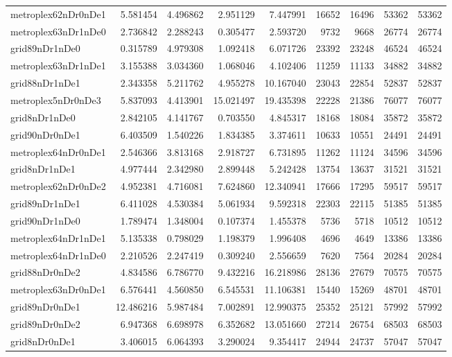 \begin{longtable}{|l|r|r|r|r|r|r|r|r|}
metroplex62nDr0nDe1 & 5.581454 & 4.496862 & 2.951129 & 7.447991 & 16652 & 16496 & 53362 & 53362 \\
metroplex63nDr1nDe0 & 2.736842 & 2.288243 & 0.305477 & 2.593720 & 9732 & 9668 & 26774 & 26774 \\
grid89nDr1nDe0 & 0.315789 & 4.979308 & 1.092418 & 6.071726 & 23392 & 23248 & 46524 & 46524 \\
metroplex63nDr1nDe1 & 3.155388 & 3.034360 & 1.068046 & 4.102406 & 11259 & 11133 & 34882 & 34882 \\
grid88nDr1nDe1 & 2.343358 & 5.211762 & 4.955278 & 10.167040 & 23043 & 22854 & 52837 & 52837 \\
metroplex5nDr0nDe3 & 5.837093 & 4.413901 & 15.021497 & 19.435398 & 22228 & 21386 & 76077 & 76077 \\
grid8nDr1nDe0 & 2.842105 & 4.141767 & 0.703550 & 4.845317 & 18168 & 18084 & 35872 & 35872 \\
grid90nDr0nDe1 & 6.403509 & 1.540226 & 1.834385 & 3.374611 & 10633 & 10551 & 24491 & 24491 \\
metroplex64nDr0nDe1 & 2.546366 & 3.813168 & 2.918727 & 6.731895 & 11262 & 11124 & 34596 & 34596 \\
grid8nDr1nDe1 & 4.977444 & 2.342980 & 2.899448 & 5.242428 & 13754 & 13637 & 31521 & 31521 \\
metroplex62nDr0nDe2 & 4.952381 & 4.716081 & 7.624860 & 12.340941 & 17666 & 17295 & 59517 & 59517 \\
grid89nDr1nDe1 & 6.411028 & 4.530384 & 5.061934 & 9.592318 & 22303 & 22115 & 51385 & 51385 \\
grid90nDr1nDe0 & 1.789474 & 1.348004 & 0.107374 & 1.455378 & 5736 & 5718 & 10512 & 10512 \\
metroplex64nDr1nDe1 & 5.135338 & 0.798029 & 1.198379 & 1.996408 & 4696 & 4649 & 13386 & 13386 \\
metroplex64nDr1nDe0 & 2.210526 & 2.247419 & 0.309240 & 2.556659 & 7620 & 7564 & 20284 & 20284 \\
grid88nDr0nDe2 & 4.834586 & 6.786770 & 9.432216 & 16.218986 & 28136 & 27679 & 70575 & 70575 \\
metroplex63nDr0nDe1 & 6.576441 & 4.560850 & 6.545531 & 11.106381 & 15440 & 15269 & 48701 & 48701 \\
grid89nDr0nDe1 & 12.486216 & 5.987484 & 7.002891 & 12.990375 & 25352 & 25121 & 57992 & 57992 \\
grid89nDr0nDe2 & 6.947368 & 6.698978 & 6.352682 & 13.051660 & 27214 & 26754 & 68503 & 68503 \\
grid8nDr0nDe1 & 3.406015 & 6.064393 & 3.290024 & 9.354417 & 24944 & 24737 & 57047 & 57047 \\

\end{longtable}
